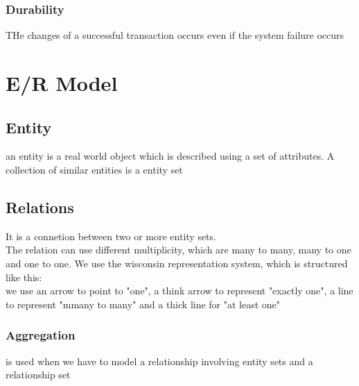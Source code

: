\documentclass[12pt, a4paper]{article}
\begin{document}
\subsubsection{Durability}
THe changes of a successful transaction occurs even if the system failure occurs

\newpage
\section{E/R Model}

\subsection{Entity}
an entity is a real world object which is described using a set of attributes. A collection of similar
entities is a entity set

\subsection{Relations}
It is a connetion between two or more entity sets. \\The relation can use different multiplicity, which
are many to many, many to one and one to one. We use the wisconsin representation system, which is 
structured like this:\\ we use an arrow to point to "one", a think arrow to represent "exactly one", a 
line to represent "mmany to many" and a thick line for "at least one"

\subsubsection{Aggregation}
is used when we have to model a relationship involving entity sets and a relationship set
\end{document}
